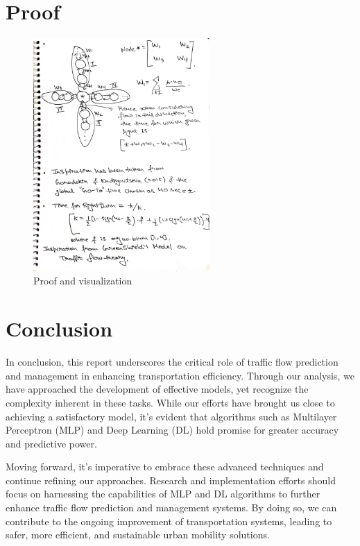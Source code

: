 \documentclass{IEEEtran}
\begin{document}
\section{Proof}
\begin{figure}[h]
    \centering
    \includegraphics[width=0.6\textwidth]{proof.jpg}
    \caption{Proof and visualization}
    \label{fig:Proof and visualization}
\end{figure}
\clearpage
\section{Conclusion}
In conclusion, this report underscores the critical role of traffic flow prediction and management in enhancing transportation efficiency. Through our analysis, we have approached the development of effective models, yet recognize the complexity inherent in these tasks. While our efforts have brought us close to achieving a satisfactory model, it's evident that algorithms such as Multilayer Perceptron (MLP) and Deep Learning (DL) hold promise for greater accuracy and predictive power.

Moving forward, it's imperative to embrace these advanced techniques and continue refining our approaches. Research and implementation efforts should focus on harnessing the capabilities of MLP and DL algorithms to further enhance traffic flow prediction and management systems. By doing so, we can contribute to the ongoing improvement of transportation systems, leading to safer, more efficient, and sustainable urban mobility solutions.
\end{document}
